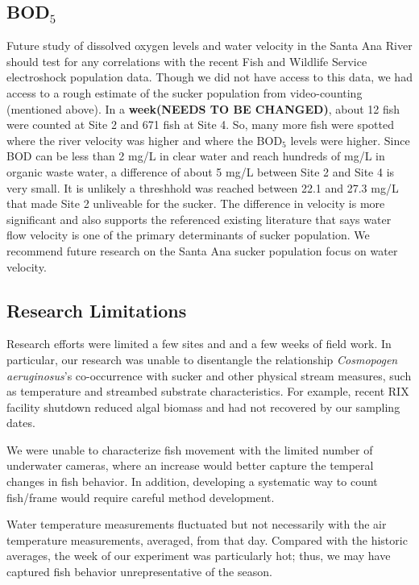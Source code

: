 \documentclass{article}\usepackage[]{graphicx}\usepackage[]{color}
\begin{document}
\subsection{BOD$_5$}
Future study of dissolved oxygen levels and water velocity in the Santa Ana River should test for any correlations with the recent Fish and Wildlife Service electroshock population data. Though we did not have access to this data, we had access to a rough estimate of the sucker population from video-counting (mentioned above). In a \textbf{week(NEEDS TO BE CHANGED)}, about 12 fish were counted at Site 2 and 671 fish at Site 4. So, many more fish were spotted where the river velocity was higher and where the BOD$_5$ levels were higher. Since BOD can be less than 2 mg/L in clear water and reach hundreds of mg/L in organic waste water, a difference of about 5 mg/L between Site 2 and Site 4 is very small. It is unlikely a threshhold was reached between 22.1 and 27.3 mg/L that made Site 2 unliveable for the sucker. The difference in velocity is more significant and also supports the referenced existing literature that says water flow velocity is one of the primary determinants of sucker population. We recommend future research on the Santa Ana sucker population focus on water velocity.

\subsection{Research Limitations}

Research efforts were limited a few sites and and a few weeks of field work. In particular, our research was unable to disentangle the relationship \emph{Cosmopogen aeruginosus}'s co-occurrence with sucker and other physical stream measures, such as temperature and streambed substrate characteristics. For example, recent RIX facility shutdown reduced algal biomass and had not recovered by our sampling dates. 

We were unable to characterize fish movement with the limited number of underwater cameras, where an increase would better capture the temperal changes in fish behavior. In addition, developing a systematic way to count fish/frame would require careful method development.  

Water temperature measurements fluctuated but not necessarily with the air temperature measurements, averaged, from that day. Compared with the historic averages, the week of our experiment was particularly hot; thus, we may have captured fish behavior unrepresentative of the season.  
\end{document}
